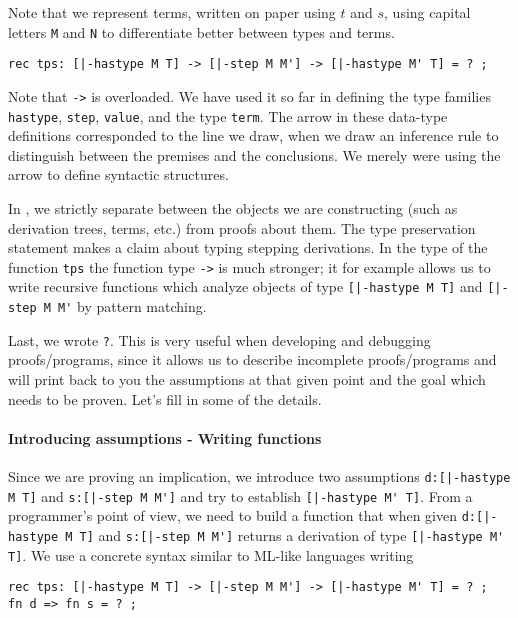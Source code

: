 Note that we represent terms, written on paper using $t$ and $s$, using capital
letters \lstinline!M! and \lstinline!N! to differentiate better between types
and terms.

\begin{lstlisting}
rec tps: [|-hastype M T] -> [|-step M M'] -> [|-hastype M' T] = ? ;
\end{lstlisting}

Note that \lstinline!->! is overloaded. We have used it so far in defining
the type families \lstinline!hastype!, \lstinline!step!,
\lstinline!value!, and the type \lstinline!term!. The arrow in these
data-type definitions corresponded to the line we draw, when we draw an
inference rule to distinguish between the premises and the
conclusions. We merely were using the arrow to define syntactic
structures.

In \beluga, we strictly separate between the objects we are
constructing (such as derivation trees, terms, etc.) from proofs about
them. The type preservation statement makes a claim about typing
stepping derivations. In the type of the function \lstinline!tps! the
function type \lstinline!->! is much stronger; it for example allows us to write
recursive functions which analyze objects of type \lstinline![|-hastype M T]! and
\lstinline![|-step M M'! by pattern matching.

Last, we wrote \lstinline!?!. This is very useful when developing and
debugging proofs/programs, since it allows us to describe incomplete
proofs/programs and \beluga will print back to you the assumptions at
that given point and the goal which needs to be proven.
Let's fill in some of the details.

\paragraph{Introducing assumptions - Writing functions} Since we are proving an
implication, we introduce two assumptions \lstinline!d:[|-hastype M T]! and
\lstinline!s:[|-step M M']! and try to establish
\lstinline![|-hastype M' T]!. From a programmer's point of view, we need
to build a function that when given \lstinline!d:[|-hastype M T]! and
\lstinline!s:[|-step M M']! returns a derivation of type
\lstinline![|-hastype M' T]!. We use a concrete syntax similar to
ML-like languages writing

\begin{lstlisting}
rec tps: [|-hastype M T] -> [|-step M M'] -> [|-hastype M' T] = ? ;
fn d => fn s = ? ;
\end{lstlisting}


